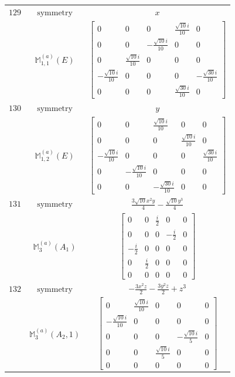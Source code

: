\documentclass[fleqn,8pt,landscape]{jsarticle}
\begin{document}
\begin{longtable}{ccc}
$ 129 $ & $ \text{symmetry} $ & $ x $ \\
$  $ & $ \mathbb{M}_{1,1}^{(a)}(E) $ & $ \begin{bmatrix} 0 & 0 & 0 & \frac{\sqrt{10} i}{10} & 0 \\ 0 & 0 & - \frac{\sqrt{10} i}{10} & 0 & 0 \\ 0 & \frac{\sqrt{10} i}{10} & 0 & 0 & 0 \\ - \frac{\sqrt{10} i}{10} & 0 & 0 & 0 & - \frac{\sqrt{30} i}{10} \\ 0 & 0 & 0 & \frac{\sqrt{30} i}{10} & 0 \end{bmatrix} $ \\ \hline
$ 130 $ & $ \text{symmetry} $ & $ y $ \\
$  $ & $ \mathbb{M}_{1,2}^{(a)}(E) $ & $ \begin{bmatrix} 0 & 0 & \frac{\sqrt{10} i}{10} & 0 & 0 \\ 0 & 0 & 0 & \frac{\sqrt{10} i}{10} & 0 \\ - \frac{\sqrt{10} i}{10} & 0 & 0 & 0 & \frac{\sqrt{30} i}{10} \\ 0 & - \frac{\sqrt{10} i}{10} & 0 & 0 & 0 \\ 0 & 0 & - \frac{\sqrt{30} i}{10} & 0 & 0 \end{bmatrix} $ \\ \hline
$ 131 $ & $ \text{symmetry} $ & $ \frac{3 \sqrt{10} x^{2} y}{4} - \frac{\sqrt{10} y^{3}}{4} $ \\
$  $ & $ \mathbb{M}_{3}^{(a)}(A_{1}) $ & $ \begin{bmatrix} 0 & 0 & \frac{i}{2} & 0 & 0 \\ 0 & 0 & 0 & - \frac{i}{2} & 0 \\ - \frac{i}{2} & 0 & 0 & 0 & 0 \\ 0 & \frac{i}{2} & 0 & 0 & 0 \\ 0 & 0 & 0 & 0 & 0 \end{bmatrix} $ \\ \hline
$ 132 $ & $ \text{symmetry} $ & $ - \frac{3 x^{2} z}{2} - \frac{3 y^{2} z}{2} + z^{3} $ \\
$  $ & $ \mathbb{M}_{3}^{(a)}(A_{2},1) $ & $ \begin{bmatrix} 0 & \frac{\sqrt{10} i}{10} & 0 & 0 & 0 \\ - \frac{\sqrt{10} i}{10} & 0 & 0 & 0 & 0 \\ 0 & 0 & 0 & - \frac{\sqrt{10} i}{5} & 0 \\ 0 & 0 & \frac{\sqrt{10} i}{5} & 0 & 0 \\ 0 & 0 & 0 & 0 & 0 \end{bmatrix} $ \\ \hline

\end{longtable}
\end{document}
